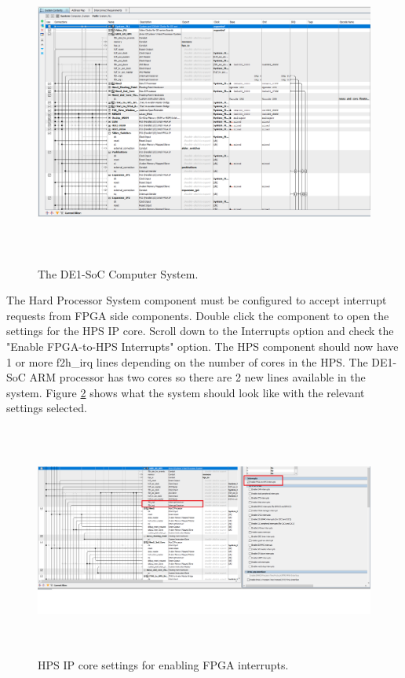 \documentclass[11pt, twoside, pdftex]{article}
\begin{document}
\begin{figure}[h!]
   \begin{center}
       \includegraphics[width=6in, height=4in]{figures/PFsys}
   \end{center}
   \caption{The DE1-SoC Computer System.}
	\label{fig:fig_PF}
\end{figure}

\newpage

The Hard Processor System component must be configured to accept interrupt requests from FPGA side components. Double click the component to open the settings for the HPS IP core. Scroll down to the Interrupts option and check the "Enable FPGA-to-HPS Interrupts"  option. The HPS component should now have 1 or more f2h{\_}irq lines depending on the number of cores in the HPS. The DE1-SoC ARM processor has two cores so there are 2 new lines available in the system. Figure \ref{fig:fig_PFsys_settings} shows what the system should look like with the relevant settings selected.

\begin{figure}[h!]
   \begin{center}
       \includegraphics[width=6in, height=3in]{figures/settings}
   \end{center}
   \caption{HPS IP core settings for enabling FPGA interrupts.}
	\label{fig:fig_PFsys_settings}
\end{figure}
\end{document}
